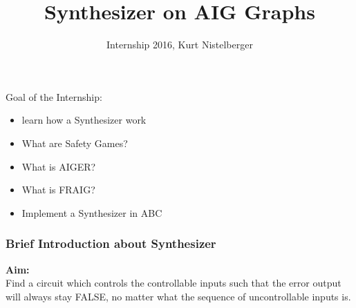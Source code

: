 \documentclass{beamer}
\title{Synthesizer on AIG Graphs}
\author{Internship 2016, Kurt Nistelberger}
\begin{document}
\maketitle
 
 
\begin{frame}

{\LARGE Goal of the Internship:} \\

\begin{itemize}
\item learn how a Synthesizer work
\item What are Safety Games?
\item What is AIGER?
\item What is FRAIG?
\item Implement a Synthesizer in ABC
\end{itemize}

\end{frame}


\begin{frame}
\frametitle{Brief Introduction about Synthesizer}


\begin{figure}
\end{figure}


\textbf{Aim:}\\
{\small
Find a circuit which controls the controllable inputs such that the
error output will always stay FALSE, no matter what the sequence of
uncontrollable inputs is.}

\end{frame}


\end{document}
